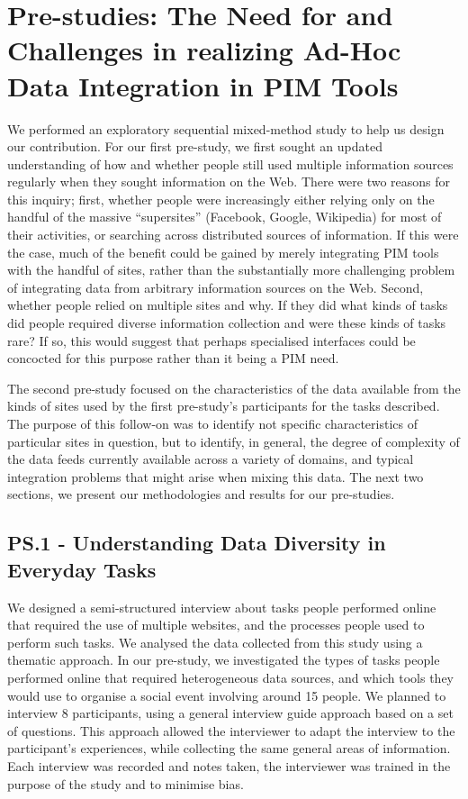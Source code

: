 \documentclass{sigchi}
\begin{document}
\section{Pre-studies: The Need for and Challenges in realizing Ad-Hoc Data Integration in PIM Tools}


We performed an exploratory sequential mixed-method study to help us design our contribution. For our first pre-study, we first sought an updated understanding of how and whether people still used multiple information sources regularly when they sought information on the Web. There were two reasons for this inquiry; first, whether people were increasingly either relying only on the handful of the massive ``supersites'' (Facebook, Google, Wikipedia) for most of their activities, or searching across distributed sources of information.  If this were the case, much of the benefit could be gained by merely integrating PIM tools with the handful of sites, rather than the substantially more challenging problem of integrating data from arbitrary information sources on the Web.   Second, whether people relied on multiple sites and why.  If they did what kinds of tasks did people required diverse information collection and were these kinds of tasks rare?  If so, this would suggest that perhaps specialised interfaces could be concocted for this purpose rather than it being a PIM need. 

The second pre-study focused on the characteristics of the data available from the kinds of sites used by the first pre-study's participants for the tasks described. The purpose of this follow-on  was to identify not specific characteristics of particular sites in question, but to identify, in general, the degree of complexity of the data feeds currently available across a variety of domains, and typical integration problems that might arise when mixing this data. The next two sections, we present our methodologies and results for our pre-studies.


\subsection{PS.1 - Understanding Data Diversity in Everyday Tasks}
We designed a semi-structured interview about tasks people performed online that required the use of multiple websites, and the processes people used to perform such tasks.  We analysed the data collected from this study using a thematic approach.  In our pre-study, we investigated the types of tasks people performed online that required heterogeneous data sources, and which tools they would use to organise a social event involving around 15 people.  We planned to interview 8 participants, using a general interview guide approach based on a set of questions.  This approach allowed the interviewer to adapt the interview to the participant's experiences, while collecting the same general areas of information.  Each interview was recorded and notes taken, the interviewer was trained in the purpose of the study and to minimise bias.
\end{document}
